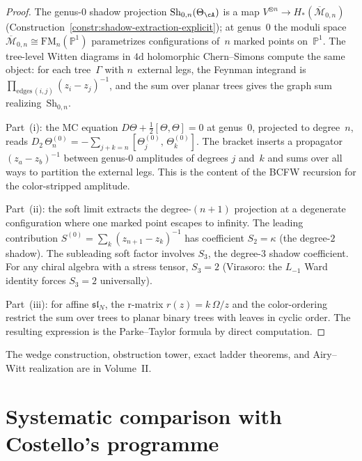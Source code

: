 \begin{proof}
The genus-$0$ shadow projection
$\mathrm{Sh}_{0,n}(\Theta_\cA)$ is a map
$V^{\otimes n} \to H_*(\overline{\mathcal{M}}_{0,n})$
(Construction~\ref{constr:shadow-extraction-explicit});
at genus~$0$ the moduli space
$\overline{\mathcal{M}}_{0,n} \cong \mathrm{FM}_n(\mathbb{P}^1)$
parametrizes configurations of~$n$ marked points on~$\mathbb{P}^1$.
The tree-level Witten diagrams in $4\mathrm{d}$ holomorphic
Chern--Simons compute the same object: for each tree~$\Gamma$
with $n$~external legs, the Feynman integrand is
$\prod_{\text{edges}\,(i,j)} (z_i - z_j)^{-1}$, and the sum
over planar trees gives the graph sum
realizing~$\mathrm{Sh}_{0,n}$.

Part~(i): the MC equation
$D\Theta + \frac{1}{2}[\Theta,\Theta] = 0$ at genus~$0$,
projected to degree~$n$, reads
$D_2\,\Theta_n^{(0)}
= -\sum_{j+k=n} [\Theta_j^{(0)},\,\Theta_k^{(0)}]$.
The bracket inserts a propagator $(z_a - z_b)^{-1}$ between
genus-$0$ amplitudes of degrees $j$ and~$k$ and sums over all
ways to partition the external legs. This is the content of the
BCFW recursion for the color-stripped amplitude.

Part~(ii): the soft limit
extracts the degree-$(n{+}1)$ projection at a degenerate
configuration where one marked point escapes to infinity.
The leading contribution
$S^{(0)} = \sum_k (z_{n+1} - z_k)^{-1}$ has coefficient
$S_2 = \kappa$ (the degree-$2$ shadow). The subleading soft
factor involves $S_3$, the degree-$3$ shadow coefficient. For
any chiral algebra with a stress tensor, $S_3 = 2$
(Virasoro: the $L_{-1}$ Ward identity forces
$S_3 = 2$ universally).

Part~(iii): for affine $\mathfrak{sl}_N$, the r-matrix
$r(z) = k\,\Omega/z$
and the color-ordering restrict the sum over trees to planar
binary trees with leaves in cyclic order. The resulting
expression is the Parke--Taylor formula by direct computation.
\end{proof}

The wedge construction, obstruction tower, exact ladder theorems,
and Airy--Witt realization are in Volume~II\@.

\section{Systematic comparison with Costello's programme}
\label{sec:costello-comparison}

